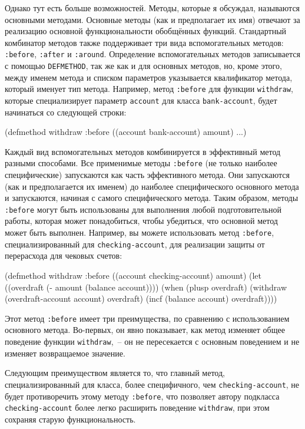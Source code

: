 Однако тут есть больше возможностей.  Методы, которые я обсуждал, называются основными
методами.  Основные методы (как и предполагает их имя) отвечают за реализацию основной
функциональности обобщённых функций.  Стандартный комбинатор методов также поддерживает
три вида вспомогательных методов: \lstinline{:before}, \lstinline{:after} и \lstinline{:around}.
Определение вспомогательных методов записывается с помощью \lstinline{DEFMETHOD}, так же как и
для основных методов, но, кроме этого, между именем метода и списком параметров указывается
квалификатор метода, который именует тип метода.  Например, метод \lstinline{:before} для
функции \lstinline{withdraw}, которые специализирует параметр \lstinline{account} для класса
\lstinline{bank-account}, будет начинаться со следующей строки:

\begin{myverb}
(defmethod withdraw :before ((account bank-account) amount) ...)
\end{myverb}

Каждый вид вспомогательных методов комбинируется в эффективный метод разными способами.
Все применимые методы \lstinline{:before} (не только наиболее специфические) запускаются как
часть эффективного метода.  Они запускаются (как и предполагается их именем) до наиболее
специфического основного метода и запускаются, начиная с самого специфического метода.
Таким образом, методы \lstinline{:before} могут быть использованы для выполнения любой
подготовительной работы, которая может понадобиться, чтобы убедиться, что основной метод
может быть выполнен.  Например, вы можете использовать метод \lstinline{:before},
специализированный для \lstinline{checking-account}, для реализации защиты от перерасхода для
чековых счетов:

\begin{myverb}
(defmethod withdraw :before ((account checking-account) amount)
  (let ((overdraft (- amount (balance account))))
    (when (plusp overdraft)
      (withdraw (overdraft-account account) overdraft)
      (incf (balance account) overdraft))))
\end{myverb}

Этот метод \lstinline{:before} имеет три преимущества, по сравнению с использованием основного
метода.  Во-первых, он явно показывает, как метод изменяет общее поведение функции
\lstinline{withdraw},~-- он не пересекается с основным поведением и не изменяет возвращаемое
значение.

Следующим преимуществом является то, что главный метод, специализированный для класса,
более специфичного, чем \lstinline{checking-account}, не будет противоречить этому методу
\lstinline{:before}, что позволяет автору подкласса \lstinline{checking-account} более легко
расширить поведение \lstinline{withdraw}, при этом сохраняя старую функциональность.

